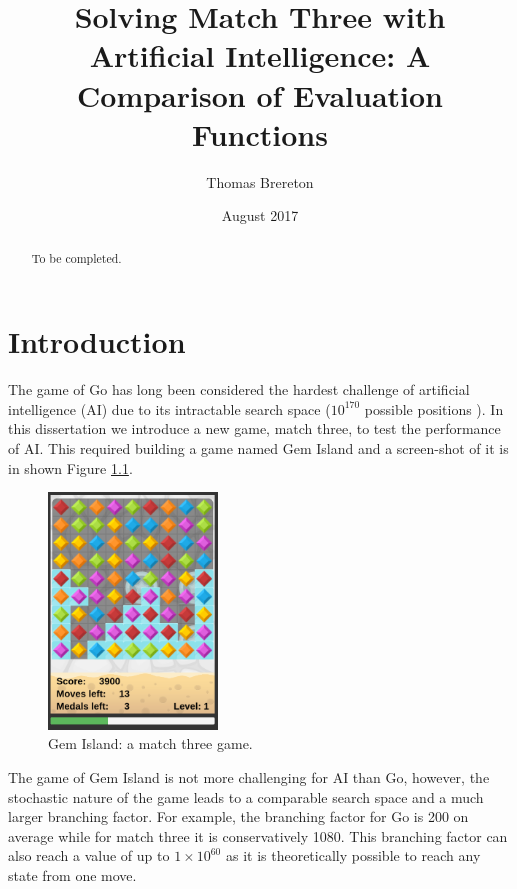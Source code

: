 \documentclass{bhamthesis}
\title{Solving Match Three with Artificial Intelligence: A Comparison of Evaluation Functions}
\author{Thomas Brereton}
\date{August 2017}  %
\makeatletter
\theoremstyle{definition}
\newcommand{\makecrestcover}{%
\begin{titlepage}
\centering\singlespacing
\vspace*{1cm}
{\huge\bfseries University of Birmingham\par}
\vspace*{2cm}
\texttt{[image: crest]}\par
\vspace*{\stretch{1}}
{\Huge\bfseries
\@author\par
\vspace{1cm}
\@title\par}
\vspace*{\stretch{1}}
{\Large\@date\par}
\end{titlepage}
}
\makeatother
\begin{document}
\frontmatter

\maketitle


\begin{abstract}
To be completed.
\end{abstract}

\tableofcontents
\mainmatter


\clearpage
\printglossaries

\chapter{Introduction}
The game of Go has long been considered the hardest challenge of artificial intelligence (AI) due to its intractable search space ($10^{170}$ possible positions \cite{Gelly2012}). In this dissertation we introduce a new game, match three, to test the performance of AI. This required building a game named Gem Island and a screen-shot of it is in shown Figure \ref{f:gameMedals}.

\begin{figure}[h]
	\centering
	\includegraphics[width=0.4\textwidth]{media/img/screen3Medals}
	\caption{Gem Island: a match three game.}\label{f:gameMedals}
\end{figure}


The game of Gem Island is not more challenging for AI than Go, however, the stochastic nature of the game leads to a comparable search space and a much larger branching factor. For example, the branching factor for Go is 200 on average \cite{Gelly2012} while for match three it is conservatively 1080. This branching factor can also reach a value of up to $1 \times 10^{60}$ as it is theoretically possible to reach any state from one move.
\end{document}

